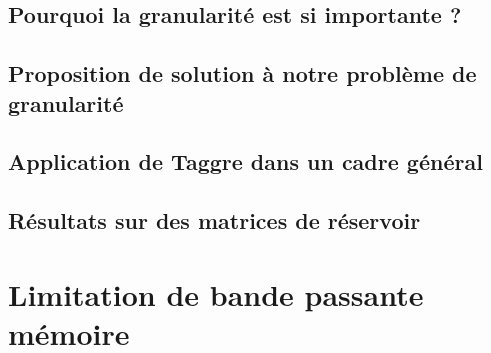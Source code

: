 \documentclass[twoside,11pt]{classes/Thesis}
\begin{document}
\section{Pourquoi la granularité est si importante ?}




\section{Proposition de solution à notre problème de granularité}









\section{Application de Taggre dans un cadre général}









\section{Résultats sur des matrices de réservoir}









\chapter{Limitation de bande passante mémoire}
\minitoc
\vspace{1cm}
\end{document}
